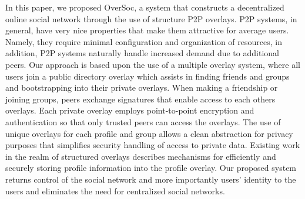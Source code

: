 \documentclass{IEEEtran}
\begin{document}
In this paper, we proposed OverSoc, a system that constructs a decentralized
online social network through the use of structure P2P overlays.  P2P systems,
in general, have very nice properties that make them attractive for average
users.  Namely, they require minimal configuration and organization of
resources, in addition, P2P systems naturally handle increased demand due to
additional peers.  Our approach is based upon the use of a multiple overlay
system, where all users join a public directory overlay which assists in
finding friends and groups and bootstrapping into their private overlays.  When
making a friendship or joining groups, peers exchange signatures that enable
access to each others overlays.  Each private overlay employs point-to-point
encryption and authentication so that only trusted peers can access the
overlays.  The use of unique overlays for each profile and group allows a clean
abstraction for privacy purposes that simplifies security handling of access to
private data.  Existing work in the realm of structured overlays describes
mechanisms for efficiently and securely storing profile information into the
profile overlay.  Our proposed system returns control of the social network and
more importantly users' identity to the users and eliminates the need for
centralized social networks.\\



\end{document}
